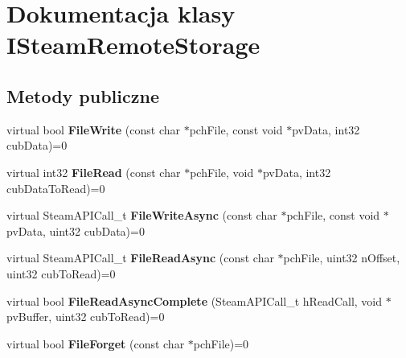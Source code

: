 \hypertarget{class_i_steam_remote_storage}{}\section{Dokumentacja klasy I\+Steam\+Remote\+Storage}
\label{class_i_steam_remote_storage}
\subsection*{Metody publiczne}
\begin{DoxyCompactItemize}
\item 
\mbox{\label{class_i_steam_remote_storage_aa0d868a38be6aa989ac94100952a0614}} 
virtual bool {\bfseries File\+Write} (const char $\ast$pch\+File, const void $\ast$pv\+Data, int32 cub\+Data)=0
\item 
\mbox{\label{class_i_steam_remote_storage_a79a08acfbc61197dc0c67de155ac9bc3}} 
virtual int32 {\bfseries File\+Read} (const char $\ast$pch\+File, void $\ast$pv\+Data, int32 cub\+Data\+To\+Read)=0
\item 
\mbox{\label{class_i_steam_remote_storage_ac589dcd725890accbcca4722c75dd12c}} 
virtual Steam\+A\+P\+I\+Call\+\_\+t {\bfseries File\+Write\+Async} (const char $\ast$pch\+File, const void $\ast$pv\+Data, uint32 cub\+Data)=0
\item 
\mbox{\label{class_i_steam_remote_storage_af7e3aa35c25a683de57226b9d5afbd14}} 
virtual Steam\+A\+P\+I\+Call\+\_\+t {\bfseries File\+Read\+Async} (const char $\ast$pch\+File, uint32 n\+Offset, uint32 cub\+To\+Read)=0
\item 
\mbox{\label{class_i_steam_remote_storage_ac95887c78a6be3b0bcbb2bbc5b2b4d66}} 
virtual bool {\bfseries File\+Read\+Async\+Complete} (Steam\+A\+P\+I\+Call\+\_\+t h\+Read\+Call, void $\ast$pv\+Buffer, uint32 cub\+To\+Read)=0
\item 
\mbox{\label{class_i_steam_remote_storage_a3afa4e53889382d6d1d6b97b4d054e86}} 
virtual bool {\bfseries File\+Forget} (const char $\ast$pch\+File)=0
\item 
\mbox{\label{class_i_steam_remote_storage_a1479b88a77c9d28d07cafbb817934ac2}} 

\end{DoxyCompactItemize}
